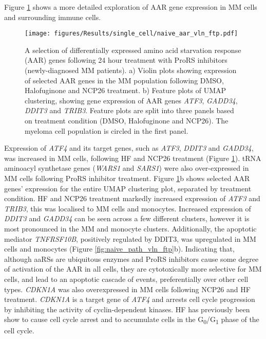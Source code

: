 Figure \ref{fig:naive_aar_vln_ftp} shows a more detailed exploration of AAR gene expression in MM cells and surrounding immune cells.
%
\begin{figure}[htb]
\centering
\texttt{[image: figures/Results/single\_cell/naive\_aar\_vln\_ftp.pdf]}
\caption[scRNA-seq differentially expressed AAR genes- newly diagnosed patients]{A selection of differentially expressed amino acid starvation response (AAR) genes following 24 hour treatment with ProRS inhibitors (newly-diagnosed MM patients).
    a) Violin plots showing expression of selected AAR genes in the MM population following DMSO, Halofuginone and NCP26 treatment.
    b) Feature plots of UMAP clustering, showing gene expression of AAR genes \textit{ATF3}, \textit{GADD34}, \textit{DDIT3} and \textit{TRIB3}.
Feature plots are split into three panels based on treatment condition (DMSO, Halofuginone and NCP26).
The myeloma cell population is circled in the first panel.}
\label{fig:naive_aar_vln_ftp}
\end{figure}
Expression of \textit{ATF4} and its target genes, such as \textit{ATF3}, \textit{DDIT3} and  \textit{GADD34}, was increased in MM cells, following HF and NCP26 treatment (Figure \ref{fig:naive_aar_vln_ftp}).
tRNA aminoacyl synthetase genes (\textit{WARS1} and \textit{SARS1}) were also over-expressed in MM cells following ProRS inhibitor treatment.
Figure \ref{fig:naive_aar_vln_ftp}b shows selected AAR genes' expression for the entire UMAP clustering plot, separated by treatment condition.
HF and NCP26 treatment markedly increased expression of \textit{ATF3} and \textit{TRIB3}, this was localised to MM cells and monocytes.
Increased expression of \textit{DDIT3} and \textit{GADD34} can be seen across a few different clusters, however it is most pronounced in the MM and monocyte clusters.
Additionally, the apoptotic mediator \textit{TNFRSF10B}, positively regulated by DDIT3, was upregulated in MM cells and monocytes (Figure \ref{fig:naive_path_vln_ftp}b).
Indicating that, although aaRSs are ubiquitous enzymes and ProRS inhibitors cause some degree of activation of the AAR in all cells, they are cytotoxically more selective for MM cells, and lead to an apoptotic cascade of events, preferentially over other cell types.
\textit{CDKN1A} was also overexpressed in MM cells following NCP26 and HF treatment.
\textit{CDKN1A} is a target gene of \textit{ATF4} and arrests cell cycle progression by inhibiting the activity of cyclin-dependent kinases.
HF has previously been show to cause cell cycle arrest and to accumulate cells in the G\textsubscript{0}/G\textsubscript{1} phase of the cell cycle.
